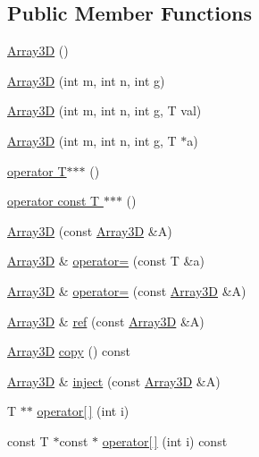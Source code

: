 \subsection*{Public Member Functions}
\begin{DoxyCompactItemize}
\item 
\hyperlink{classTNT_1_1Array3D_a94ceeeadc5904e9ec4069ef61394ff8e}{Array3D} ()
\item 
\hyperlink{classTNT_1_1Array3D_a3556263018d605d22ce74699f3898559}{Array3D} (int m, int n, int g)
\item 
\hyperlink{classTNT_1_1Array3D_a3e5d89a3999c39540a441aeebcd8edc4}{Array3D} (int m, int n, int g, T val)
\item 
\hyperlink{classTNT_1_1Array3D_a5830c3a1275b2498bdceb6502e63c28f}{Array3D} (int m, int n, int g, T $\ast$a)
\item 
\hyperlink{classTNT_1_1Array3D_ab759135a50b2705bfc1ca7455c426b0a}{operator T$\ast$$\ast$$\ast$} ()
\item 
\hyperlink{classTNT_1_1Array3D_a420ffed5ca81952d989afe406450a9b0}{operator const T $\ast$$\ast$$\ast$} ()
\item 
\hyperlink{classTNT_1_1Array3D_ae137326853df4e4cdcc52afff3f5d85a}{Array3D} (const \hyperlink{classTNT_1_1Array3D}{Array3D} \&A)
\item 
\hyperlink{classTNT_1_1Array3D}{Array3D} \& \hyperlink{classTNT_1_1Array3D_a405e5c9c24c7b3895533fa8f870f9bfd}{operator=} (const T \&a)
\item 
\hyperlink{classTNT_1_1Array3D}{Array3D} \& \hyperlink{classTNT_1_1Array3D_a13fa6cf87fcfc5847972569f325f9b56}{operator=} (const \hyperlink{classTNT_1_1Array3D}{Array3D} \&A)
\item 
\hyperlink{classTNT_1_1Array3D}{Array3D} \& \hyperlink{classTNT_1_1Array3D_aded40455c8a0b48c3c3d0688ea90180a}{ref} (const \hyperlink{classTNT_1_1Array3D}{Array3D} \&A)
\item 
\hyperlink{classTNT_1_1Array3D}{Array3D} \hyperlink{classTNT_1_1Array3D_a7f24fda8bf695184726a1b6d6bd31bbf}{copy} () const
\item 
\hyperlink{classTNT_1_1Array3D}{Array3D} \& \hyperlink{classTNT_1_1Array3D_ac9004a4cc385cbfc0d3b742efd605e1c}{inject} (const \hyperlink{classTNT_1_1Array3D}{Array3D} \&A)
\item 
T $\ast$$\ast$ \hyperlink{classTNT_1_1Array3D_aea9175ed3125b3061f3be0db72656518}{operator\mbox{[}$\,$\mbox{]}} (int i)
\item 
const T $\ast$const  $\ast$ \hyperlink{classTNT_1_1Array3D_add71da16792b166caa02f3d085e86af6}{operator\mbox{[}$\,$\mbox{]}} (int i) const
$$
\end{DoxyCompactItemize}
